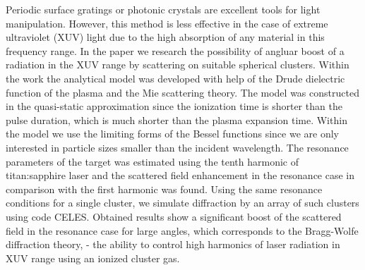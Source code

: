 Periodic surface gratings or photonic crystals are excellent tools for light manipulation. However, this method is less effective in the case of extreme ultraviolet (XUV) light due to the high absorption of any material in this frequency range. In the paper we research the possibility of angluar boost of a radiation in the XUV range by scattering on suitable spherical clusters. Within the work the analytical model was developed with help of the Drude dielectric function of the plasma and the Mie scattering theory. The model was constructed in the quasi-static approximation since the ionization time is shorter than the pulse duration, which is much shorter than the plasma expansion time. Within the model we use the limiting forms of the Bessel functions since we are only interested in particle sizes smaller than the incident wavelength. The resonance parameters of the target was estimated using the tenth harmonic of titan:sapphire laser and the scattered field enhancement in the resonance case in comparison with the first harmonic was found. Using the same resonance conditions for a single cluster, we simulate diffraction by an array of such clusters using code CELES. Obtained results show a significant boost of the scattered field in the resonance case for large angles, which corresponds to the Bragg-Wolfe diffraction theory, - the ability to control high harmonics of laser radiation in XUV range using an ionized cluster gas.